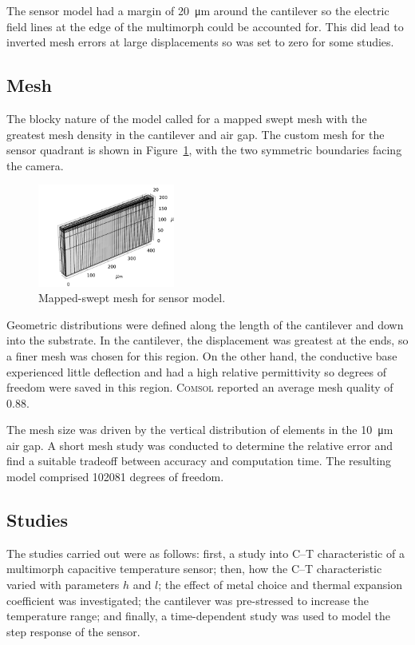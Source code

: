 \documentclass[a4paper,10pt,twocolumn]{article}
\newcommand{\Comsol}{\textsc{Comsol}\xspace}
\begin{document}
The sensor model had a margin of \SI{20}{\micro\meter} around the cantilever so
the electric field lines at the edge of the multimorph could be accounted for.
This did lead to inverted mesh errors at large displacements so was set to zero
for some studies.
 
\subsection{Mesh}

The blocky nature of the model called for a mapped swept mesh with the greatest
mesh density in the cantilever and air gap. The custom mesh for the sensor
quadrant is shown in Figure~\ref{fig:mesh}, with the two symmetric boundaries
facing the camera.

\begin{figure}[h]
    \centering
    \includegraphics[width=0.4\textwidth]{img/mesh.png}
    \caption{Mapped-swept mesh for sensor model.}
    \label{fig:mesh}
\end{figure}

Geometric distributions were defined along the length of the cantilever and down
into the substrate. In the cantilever, the displacement was greatest at the
ends, so a finer mesh was chosen for this region. On the other hand, the
conductive base experienced little deflection and had a high relative
permittivity so degrees of freedom were saved in this region. \Comsol reported
an average mesh quality of 0.88.

The mesh size was driven by the vertical distribution of elements in the 
\SI{10}{\micro\meter} air gap. A short mesh study was conducted to determine the 
relative error and find a suitable tradeoff between accuracy and computation
time. The resulting model comprised 102081 degrees of freedom.

\subsection{Studies}

The studies carried out were as follows: first, a study into C--T characteristic
of a multimorph capacitive temperature sensor; then, how the C--T characteristic
varied with parameters $h$ and $l$; the effect of metal choice and thermal
expansion coefficient was investigated; the cantilever was pre-stressed to
increase the temperature range; and finally, a time-dependent study was used to
model the step response of the sensor.
\end{document}
